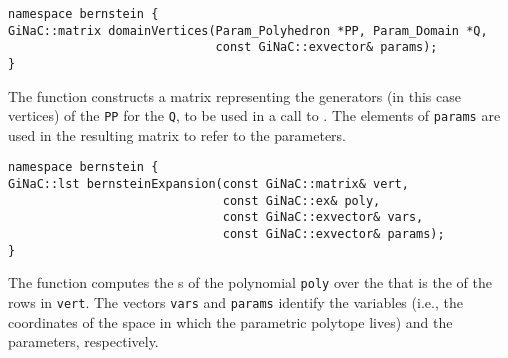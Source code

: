 \begin{verbatim}
namespace bernstein {
GiNaC::matrix domainVertices(Param_Polyhedron *PP, Param_Domain *Q, 
                             const GiNaC::exvector& params);
}
\end{verbatim}
The function  constructs a matrix representing the
generators (in this case vertices) of the  {\tt PP}
for the  {\tt Q}, to be used
in a call to .
The elements of {\tt params} are used in the resulting matrix
to refer to the parameters.

\begin{verbatim}
namespace bernstein {
GiNaC::lst bernsteinExpansion(const GiNaC::matrix& vert,
                              const GiNaC::ex& poly,
                              const GiNaC::exvector& vars,
                              const GiNaC::exvector& params);
}
\end{verbatim}
The function  computes the
s of the polynomial \verb+poly+
over the  that is the 
of the rows in \verb+vert+.  The vectors \verb+vars+
and \verb+params+ identify the variables (i.e., the coordinates
of the space in which the parametric polytope lives) and
the parameters, respectively.

